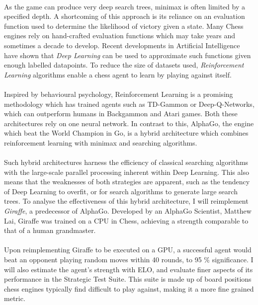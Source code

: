 \documentclass[a4paper]{article}
\begin{document}
\paragraph{}As the game can produce very deep search trees, minimax is often limited by a specified depth. \cite{russellNorvig} A shortcoming of this approach is its reliance on an evaluation function used to determine the likelihood of victory given a state. \cite{giraffe} Many Chess engines rely on hand-crafted evaluation functions which may take years and sometimes a decade to develop. \cite{stockfish} Recent developments in Artificial Intelligence have shown that \textit{Deep Learning} can be used to approximate such functions given enough labelled datapoints. \cite{bishop} To reduce the size of datasets used, \textit{Reinforcement Learning} algorithms enable a chess agent to learn by playing against itself. \cite{giraffe}

\paragraph{}Inspired by behavioural psychology, \cite{Sutton} Reinforcement Learning is a promising methodology which has trained agents such as TD-Gammon or Deep-Q-Networks, which can outperform humans in Backgammon and Atari games. \cite{TD-Gammon} \cite{DQN} Both these architectures rely on one neural network. In contrast to this, AlphaGo, the engine which beat the World Champion in Go, is a hybrid architecture which combines reinforcement learning with minimax and searching algorithms. \cite{AlphaGo}

\paragraph{}Such hybrid architectures harness the efficiency of classical searching algorithms with the large-scale parallel processing inherent within Deep Learning. This also means that the weaknesses of both strategies are apparent, such as the tendency of Deep Learning to overfit, or for search algorithms to generate large search trees. To analyse the effectiveness of this hybrid architecture, I will reimplement \textit{Giraffe}, a predecessor of AlphaGo. Developed by an AlphaGo Scientist, Matthew Lai, Giraffe was trained on a CPU in Chess, achieving a strength comparable to that of a human grandmaster. \cite{giraffe}

\paragraph{}Upon reimplementing Giraffe to be executed on a GPU, a successful agent would beat an opponent playing random moves within 40 rounds, to 95 \% significance. I will also estimate the agent's strength with ELO, and evaluate finer aspects of its performance in the Strategic Test Suite. This suite is made up of board positions chess engines typically find difficult to play against, making it a more fine grained metric. \cite{sts}
\end{document}
